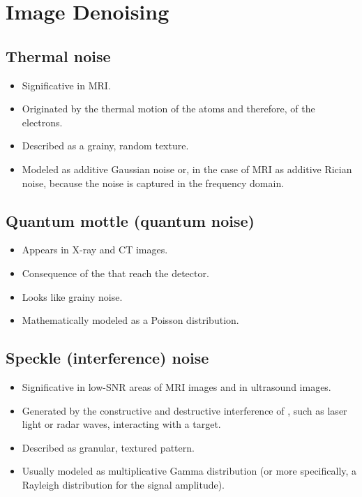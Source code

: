 \chapter{Image Denoising}

\section{Thermal noise}
\begin{itemize}
\item Significative in \gls{MRI}.
\item Originated by the thermal motion of the atoms and therefore, of
  the electrons.
\item Described as a grainy, random texture.
\item Modeled as additive Gaussian noise or, in the case of \gls{MRI}
  as additive Rician noise, because the noise is captured in the
  frequency domain.
\end{itemize}

\section{Quantum mottle (quantum noise)}
\begin{itemize}
\item Appears in X-ray and \gls{CT} images.
\item Consequence of the  that reach the detector.
\item Looks like grainy noise. 
\item Mathematically modeled as a  Poisson
  distribution.
\end{itemize}

\section{Speckle (interference) noise}
\begin{itemize}
\item Significative in low-SNR areas of \gls{MRI} images and in ultrasound images.
\item Generated by the constructive and destructive interference of
  , such as laser light or
  radar waves, interacting with a target.
\item Described as granular, textured pattern.
\item Usually modeled as multiplicative Gamma distribution (or more
  specifically, a Rayleigh distribution for the signal amplitude).
\end{itemize}

